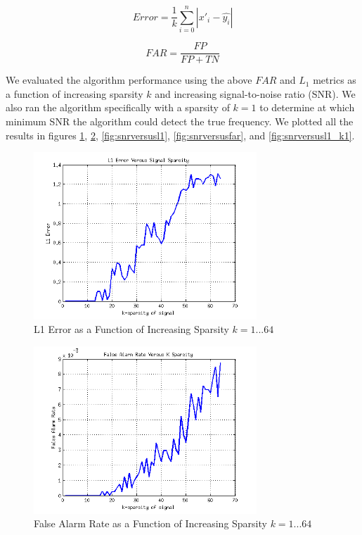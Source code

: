 \documentclass[journal]{IEEEtran}
\begin{document}
\begin{equation}
Error = \frac{1}{k}\sum_{i=0}^{n}|{\hat{x'_i} - \hat{y_i}}|
\label{eq:eq1}
\end{equation}

\begin{equation}
FAR = \frac{FP}{FP + TN}
\label{eq:eq2}
\end{equation}

\par We evaluated the algorithm performance using the above \(FAR\) and \(L_1\) metrics as a function of increasing sparsity \(k\) and increasing signal-to-noise ratio (SNR). We also ran the algorithm specifically with a sparsity of \(k=1\) to determine at which minimum SNR the algorithm could detect the true frequency. We plotted all the results in figures \ref{fig:kversusl1}, \ref{fig:kversusfar}, \ref{fig:snrversusl1}, \ref{fig:snrversusfar}, and \ref{fig:snrversusl1_k1}.


\begin{figure}[h]
\centering
\includegraphics[width=3.3in]{../images/kversusl1.png}
\caption{L1 Error as a Function of Increasing Sparsity \(k=1...64\)}
\label{fig:kversusl1}
\end{figure}

\begin{figure}[h]
\centering
\includegraphics[width=3.3in]{../images/kversusfar.png}
\caption{False Alarm Rate as a Function of Increasing Sparsity \(k=1...64\)}
\label{fig:kversusfar}
\end{figure}
\end{document}
